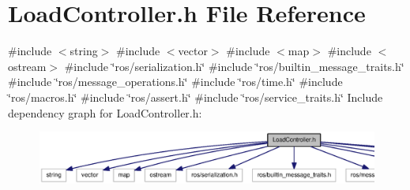 \section{\-Load\-Controller.\-h \-File \-Reference}
\label{LoadController_8h}
{\ttfamily \#include $<$string$>$}\*
{\ttfamily \#include $<$vector$>$}\*
{\ttfamily \#include $<$map$>$}\*
{\ttfamily \#include $<$ostream$>$}\*
{\ttfamily \#include \char`\"{}ros/serialization.\-h\char`\"{}}\*
{\ttfamily \#include \char`\"{}ros/builtin\-\_\-message\-\_\-traits.\-h\char`\"{}}\*
{\ttfamily \#include \char`\"{}ros/message\-\_\-operations.\-h\char`\"{}}\*
{\ttfamily \#include \char`\"{}ros/time.\-h\char`\"{}}\*
{\ttfamily \#include \char`\"{}ros/macros.\-h\char`\"{}}\*
{\ttfamily \#include \char`\"{}ros/assert.\-h\char`\"{}}\*
{\ttfamily \#include \char`\"{}ros/service\-\_\-traits.\-h\char`\"{}}\*
\-Include dependency graph for \-Load\-Controller.\-h\-:
\nopagebreak
\begin{figure}[H]
\begin{center}
\leavevmode
\includegraphics[width=350pt]{LoadController_8h__incl}
\end{center}
\end{figure}
